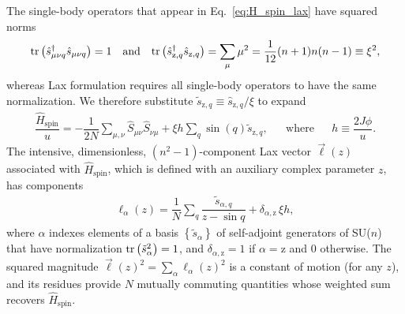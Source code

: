 \documentclass[aps,pra,nofootinbib,twocolumn,superscriptaddress]{revtex4-2}
\renewcommand{\t}{\text} %
\newcommand{\f}[2]{\dfrac{#1}{#2}} %
\newcommand{\p}[1]{\left(#1\right)} %
\renewcommand{\set}[1]{\left\{#1\right\}} %
\newcommand{\1}{\mathds{1}}
\newcommand{\s}{\hat{s}}
\renewcommand{\H}{\hat{H}}
\renewcommand{\S}{\hat{S}}
\newcommand{\z}{\text{z}}
\newcommand{\spin}{\text{spin}}
\begin{document}
The single-body operators that appear in Eq.~\eqref{eq:H_spin_lax} have squared norms
\begin{align}
  \tr\p{\s_{\mu\nu q}^\dag \s_{\mu\nu q}} = 1
  &&
  \t{and}
  &&
  \tr\p{\s_{\z,q}^\dag \s_{\z,q}}
  = \sum_\mu \mu^2
  = \f1{12} (n+1) n (n-1)
  \equiv \xi^2,
\end{align}
whereas Lax formulation requires all single-body operators to have the same normalization.
We therefore substitute $\tilde{s}_{\z,q}\equiv \s_{\z,q}/\xi$ to expand
\begin{align}
  \f{\H_\spin}{u}
  = -\f1{2N} \sum_{\mu,\nu} \S_{\mu\nu} \S_{\nu\mu}
  + \xi h \sum_q \sin\p{q} \tilde{s}_{\z,q},
  &&
  \t{where}
  &&
  h \equiv \f{2J\phi}{u}.
\end{align}
The intensive, dimensionless, $(n^2-1)$-component Lax vector $\vec\ell\p{z}$ associated with $\H_\spin$, which is defined with an auxiliary complex parameter $z$, has components
\begin{align}
  \ell_\alpha\p{z}
  = \f1N \sum_q \f{\tilde{s}_{\alpha,q}}{z-\sin q}
  + \delta_{\alpha,\z} \, \xi h,
\end{align}
where $\alpha$ indexes elements of a basis $\set{\tilde{s}_\alpha}$ of self-adjoint generators of SU($n$) that have normalization $\tr\p{\tilde{s}_\alpha^2}=1$, and $\delta_{\alpha,\z}=1$ if $\alpha=\z$ and $0$ otherwise.
The squared magnitude $\vec\ell\p{z}^2=\sum_\alpha\ell_\alpha\p{z}^2$ is a constant of motion (for any $z$), and its residues provide $N$ mutually commuting quantities whose weighted sum recovers $\H_\spin$.
\end{document}
